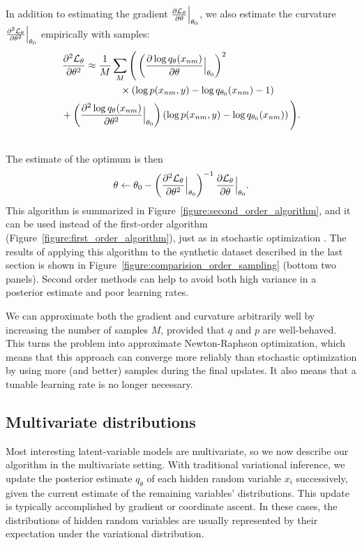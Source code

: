 In addition to estimating the gradient $\frac{\partial \mathcal{L}_\theta }{\partial \theta} \Bigr|_{\theta_0}$, we also estimate the curvature
$\frac{\partial^2 \mathcal{L}_\theta }{\partial {\theta}^2} \Bigr|_{\theta_0}$
empirically with samples:
\begin{align}
  \label{equation:empirical_second_order_estimates}
  \displaystyle \partll{\mathcal{L}_\theta }{\theta} & \approx
  \frac{1}{M} \sum_M \Bigg(
  \left( \partl{\log q_\theta(x_{nm})}{\theta} \Bigr|_{\theta_0} \right)^2 \\ \nonumber
  & \hspace{35pt} \times \left( \log p(x_{nm},  y) - \log q_{\theta_0}(x_{nm}) - 1 \right)  \\ \nonumber
 &   \hspace{-25pt} + \left( \partll{\log q_\theta(x_{nm})}{\theta} \Bigr|_{\theta_0} \right) \left( \log p(x_{nm},  y) - \log q_{\theta_0}(x_{nm}) \right) \Bigg). \\ \nonumber
\end{align}
The estimate of the optimum is then
\begin{align}
  \displaystyle \theta \gets \theta_0 - \left( 
  \frac{\partial^2 \mathcal{L}_\theta }{\partial {\theta}^2} \Bigr|_{\theta_0}
  \right)^{-1}
  \frac{\partial \mathcal{L}_\theta }{\partial \theta} \Bigr|_{\theta_0}.
  \label{equation:second_order_updates}
\end{align}
This algorithm is summarized in
Figure~\ref{figure:second_order_algorithm}, and it can be used instead
of the first-order algorithm
(Figure~\ref{figure:first_order_algorithm}), just as in stochastic
optimization \cite{bottou:2004}.  The results of applying this
algorithm to the synthetic dataset described in the last section is
shown in Figure~\ref{figure:comparision_order_sampling} (bottom two
panels).  Second order methods can help to avoid both high variance in
a posterior estimate and poor learning rates.

We can approximate both the gradient and curvature arbitrarily well by
increasing the number of samples $M$, provided that $q$ and $p$ are
well-behaved.  This turns the problem into approximate Newton-Raphson
optimization, which means that this approach can converge more
reliably than stochastic optimization by using more (and better)
samples during the final updates.  It also means that a tunable
learning rate is no longer necessary.

\subsection{Multivariate distributions}
Most interesting latent-variable models are multivariate, so we now describe
our algorithm in the multivariate setting.  With traditional variational
inference, we update the posterior estimate $q_\theta$ of each hidden
random variable $x_i$ successively, given the current estimate of the
remaining variables' distributions.  This update is typically
accomplished by gradient or coordinate ascent.  In these cases, the
distributions of hidden random variables are usually represented by
their expectation under the variational distribution.

